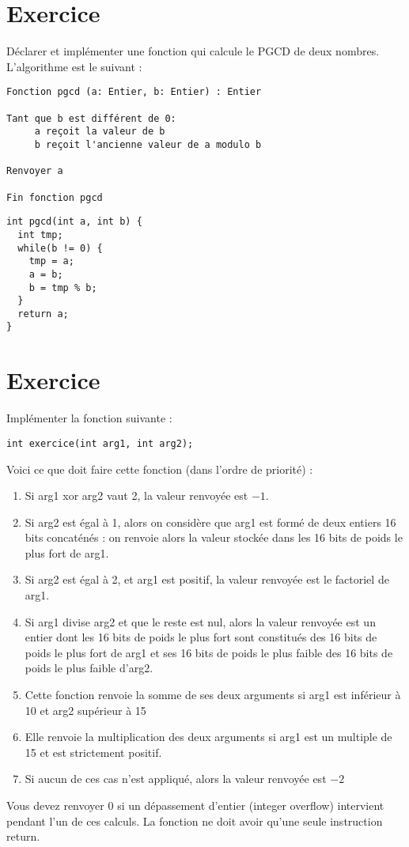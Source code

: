 \documentclass[10pt]{article}
\begin{document}
\section{Exercice}
Déclarer et implémenter une fonction qui calcule le \ac{PGCD} de deux nombres.
L'algorithme est le suivant :

\begin{verbatim}
Fonction pgcd (a: Entier, b: Entier) : Entier

Tant que b est différent de 0:
     a reçoit la valeur de b
     b reçoit l'ancienne valeur de a modulo b

Renvoyer a

Fin fonction pgcd
\end{verbatim}

\begin{verbatim}
int pgcd(int a, int b) {
  int tmp;
  while(b != 0) {
    tmp = a;
    a = b;
    b = tmp % b;  
  }
  return a;
}
\end{verbatim}

\section{Exercice}
Implémenter la fonction suivante :
\begin{verbatim}
int exercice(int arg1, int arg2);
\end{verbatim}

Voici ce que doit faire cette fonction (dans l'ordre de priorité) :
\begin{enumerate}
  \item Si arg1 xor arg2 vaut 2, la valeur renvoyée est $-1$.
  \item Si arg2 est égal à 1, alors on considère que arg1 est formé de deux entiers 16 bits concaténés : on renvoie alors la valeur stockée dans les 16 bits de poids le plus fort de arg1.
  \item Si arg2 est égal à 2, et arg1 est positif, la valeur renvoyée est le factoriel de arg1.
  \item Si arg1 divise arg2 et que le reste est nul, alors la valeur renvoyée est un entier dont les 16 bits de poids le plus fort sont constitués des 16 bits de poids le plus fort de arg1 et ses 16 bits de poids le plus faible des 16 bits de poids le plus faible d'arg2.
  \item Cette fonction renvoie la somme de ses deux arguments si arg1 est inférieur à 10 et arg2 supérieur à 15
  \item Elle renvoie la multiplication des deux arguments si arg1 est un multiple de 15 et est strictement positif.
  \item Si aucun de ces cas n'est appliqué, alors la valeur renvoyée est $-2$
\end{enumerate}
Vous devez renvoyer 0 si un dépassement d'entier (integer overflow) intervient pendant l'un de ces calculs.
La fonction ne doit avoir qu'une seule instruction return.
\end{document}
